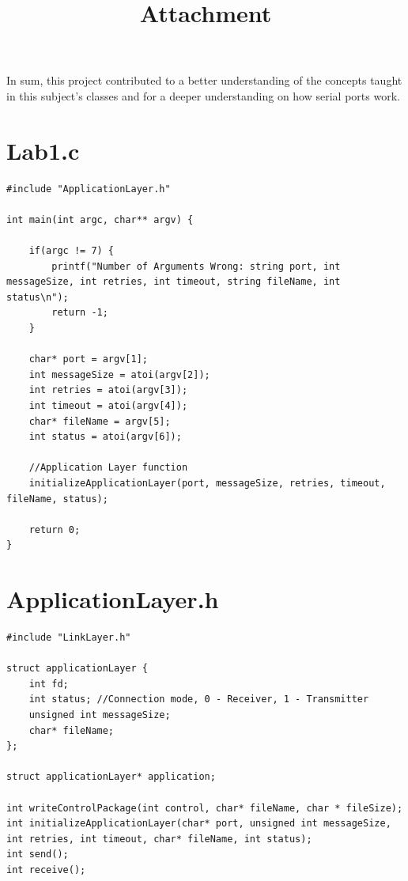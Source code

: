 \documentclass[a4paper]{article}
\begin{document}
In sum, this project contributed to a better understanding of the concepts taught in this subject's classes and for a deeper understanding on how serial ports work.

\newpage
\clearpage
\vspace*{\fill}
\begin{center}
\begin{minipage}{0.5\textwidth}
\title{\Huge\textbf{Attachment}}
\end{minipage}
\end{center}
\vfill %
\clearpage
\newpage

\section{Lab1.c}
\begin{lstlisting}
#include "ApplicationLayer.h"

int main(int argc, char** argv) {

    if(argc != 7) {
        printf("Number of Arguments Wrong: string port, int messageSize, int retries, int timeout, string fileName, int status\n");
        return -1;
    }
	
    char* port = argv[1];
    int messageSize = atoi(argv[2]);
    int retries = atoi(argv[3]);
    int timeout = atoi(argv[4]);
    char* fileName = argv[5];
    int status = atoi(argv[6]);

    //Application Layer function
    initializeApplicationLayer(port, messageSize, retries, timeout, fileName, status);

    return 0;
}
\end{lstlisting}
\newpage

\section{ApplicationLayer.h}
\begin{lstlisting}
#include "LinkLayer.h"

struct applicationLayer {
    int fd;
    int status; //Connection mode, 0 - Receiver, 1 - Transmitter
    unsigned int messageSize;
    char* fileName;
};

struct applicationLayer* application;

int writeControlPackage(int control, char* fileName, char * fileSize);
int initializeApplicationLayer(char* port, unsigned int messageSize, int retries, int timeout, char* fileName, int status);
int send();
int receive();
\end{lstlisting}
\newpage
\end{document}
